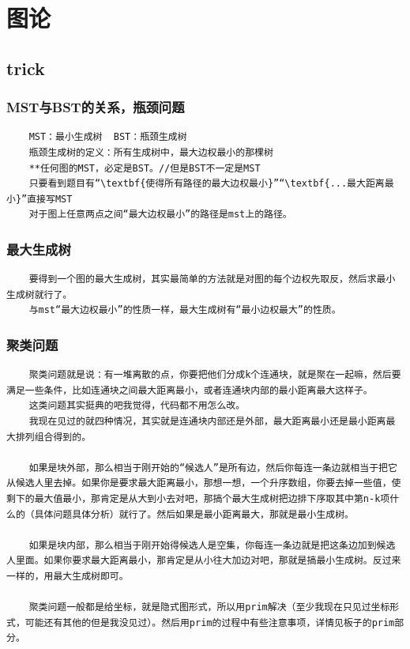 \documentclass[10pt, a4paper, twocolumn]{article} %
\begin{document}
    \section{图论}
    \subsection{trick}
    \subsubsection{MST与BST的关系，瓶颈问题}
    \begin{lstlisting}
    MST：最小生成树  BST：瓶颈生成树
    瓶颈生成树的定义：所有生成树中，最大边权最小的那棵树
    **任何图的MST，必定是BST。//但是BST不一定是MST
    只要看到题目有“\textbf{使得所有路径的最大边权最小}”“\textbf{...最大距离最小}”直接写MST
    对于图上任意两点之间“最大边权最小”的路径是mst上的路径。
    \end{lstlisting}
    \subsubsection{最大生成树}
    \begin{lstlisting}
    要得到一个图的最大生成树，其实最简单的方法就是对图的每个边权先取反，然后求最小生成树就行了。
    与mst“最大边权最小”的性质一样，最大生成树有“最小边权最大”的性质。
    \end{lstlisting}
    \subsubsection{聚类问题}
    \begin{lstlisting}
    聚类问题就是说：有一堆离散的点，你要把他们分成k个连通块，就是聚在一起嘛，然后要满足一些条件，比如连通块之间最大距离最小，或者连通块内部的最小距离最大这样子。
    这类问题其实挺典的吧我觉得，代码都不用怎么改。
    我现在见过的就四种情况，其实就是连通块内部还是外部，最大距离最小还是最小距离最大排列组合得到的。
    
    如果是块外部，那么相当于刚开始的“候选人”是所有边，然后你每连一条边就相当于把它从候选人里去掉。如果你是要求最大距离最小，那想一想，一个升序数组，你要去掉一些值，使剩下的最大值最小，那肯定是从大到小去对吧，那搞个最大生成树把边排下序取其中第n-k项什么的（具体问题具体分析）就行了。然后如果是最小距离最大，那就是最小生成树。

    如果是块内部，那么相当于刚开始得候选人是空集，你每连一条边就是把这条边加到候选人里面。如果你要求最大距离最小，那肯定是从小往大加边对吧，那就是搞最小生成树。反过来一样的，用最大生成树即可。

    聚类问题一般都是给坐标，就是隐式图形式，所以用prim解决（至少我现在只见过坐标形式，可能还有其他的但是我没见过）。然后用prim的过程中有些注意事项，详情见板子的prim部分。
    \end{lstlisting}
\end{document}
